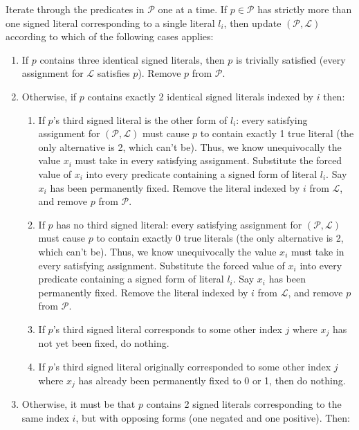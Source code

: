 \documentclass{article}
\begin{document}
Iterate through the predicates in $\mathcal{P}$ one at a time.  If $p\in \mathcal{P}$ has strictly more than one signed literal corresponding to a single literal $l_i$, then update $(\mathcal{P}, \mathcal{L})$ according to which of the following cases applies:
\begin{enumerate}
\item If $p$ contains three identical signed literals, then $p$ is trivially satisfied (every assignment for $\mathcal{L}$ satisfies $p$). Remove $p$ from $\mathcal{P}$.
\item Otherwise, if $p$ contains exactly 2 identical signed literals indexed by $i$ then:
\begin{enumerate}
\item If $p$'s third signed literal is the other form of $l_i$: every satisfying assignment for $(\mathcal{P}, \mathcal{L})$ must cause $p$ to contain exactly 1 true literal (the only alternative is 2, which can't be). Thus, we know unequivocally the value $x_i$ must take in every satisfying assignment. Substitute the forced value of $x_i$ into every predicate containing a signed form of literal $l_i$. Say $x_i$ has been permanently fixed. Remove the literal indexed by $i$ from $\mathcal{L}$, and remove $p$ from $\mathcal{P}$. 
\item If $p$ has no third signed literal: every satisfying assignment for $(\mathcal{P}, \mathcal{L})$ must cause $p$ to contain exactly 0 true literals (the only alternative is 2, which can't be). Thus, we know unequivocally the value $x_i$ must take in every satisfying assignment. Substitute the forced value of $x_i$ into every predicate containing a signed form of literal $l_i$. Say $x_i$ has been permanently fixed. Remove the literal indexed by $i$ from $\mathcal{L}$, and remove $p$ from $\mathcal{P}$. 

\item If $p$'s third signed literal corresponds to some other index $j$ where $x_j$ has not yet been fixed, do nothing.

\item If $p$'s third signed literal originally corresponded to some other index $j$ where $x_j$ has already been permanently fixed to 0 or 1, then do nothing. 

\end{enumerate}
\item Otherwise, it must be that $p$ contains 2 signed literals corresponding to the same index $i$, but with opposing forms (one negated and one positive).  Then:
\begin{enumerate}



\end{enumerate}
\end{enumerate}
\end{document}
